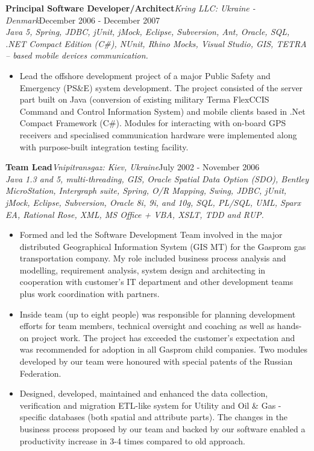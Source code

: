 \documentclass{res}
\newcommand{\jobdes}[4]{\needspace{3\baselineskip} %
{\noindent \bf #3\hspace{2ex}}{{\em \small #1}}{\hfill #2}\\{{\it \small #4.}}}
\newif\ifFullVersion
\begin{document}
\begin{resume}
\jobdes {Kring LLC: Ukraine - Denmark}{December 2006 - December 2007}{Principal Software Developer/Architect}
{Java 5, Spring, JDBC, jUnit, jMock, Eclipse, Subversion, Ant, Oracle, SQL, .NET Compact Edition (C\#), NUnit, Rhino Mocks, Visual Studio, GIS, TETRA – based mobile devices communication}
\begin{itemize} \itemsep -2pt %
 \item Lead the offshore development project of a major Public Safety and Emergency (PS\&E) system development. The project consisted of the server part built on Java (conversion of existing military Terma FlexCCIS Command and Control Information System) and mobile clients based in .Net Compact Framework (C\#). Modules for interacting with on-board GPS receivers and specialised communication hardware were implemented along with purpose-built integration testing facility.
\end{itemize}

\jobdes{Vnipitransgaz: Kiev, Ukraine}{July 2002 - November 2006}{Team Lead}
{Java 1.3 and 5, multi-threading, GIS, Oracle Spatial Data Option (SDO), Bentley MicroStation, Intergraph suite, Spring, O/R Mapping, Swing, JDBC, jUnit, jMock, Eclipse, Subversion, Oracle 8i, 9i, and 10g, SQL, PL/SQL, UML, Sparx EA, Rational Rose, XML, MS Office + VBA, XSLT, TDD and RUP}
\begin{itemize} \itemsep -2pt %
 \item Formed and led the Software Development Team involved in the major distributed Geographical Information System (GIS MT) for the Gasprom gas transportation company. My role included business process analysis and modelling, requirement analysis, system design and architecting in cooperation with customer’s IT department and other development teams plus work coordination with partners.
 \item Inside team (up to eight people) was responsible for planning development efforts for team members, technical oversight and coaching as well as hands-on project work. The project has exceeded the customer’s expectation and was recommended for adoption in all Gasprom child companies. Two modules developed by our team were honoured with special patents of the Russian Federation.
 \ifFullVersion
 \item Wrote, maintained, and enhanced the numerous smaller projects for Energy, Utility and Oil\&Gas - oriented customers in the Data Capture, Data Verification and ETL areas.
\else
   \item Designed, developed, maintained and enhanced the data collection, verification and migration ETL-like system for Utility and Oil \& Gas - specific databases (both spatial and attribute parts). The changes in the business process proposed by our team and backed by our software enabled a productivity increase in 3-4 times compared to old approach.
\fi
\end{itemize}


\end{resume}
\end{document}
